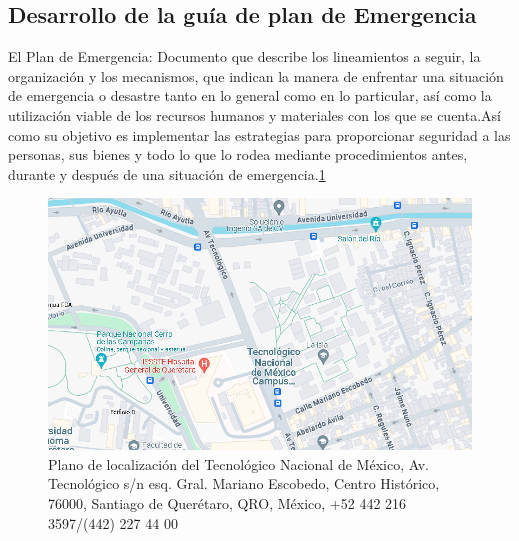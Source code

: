     \subsection{Desarrollo de la guía de plan de Emergencia}
    
El Plan de Emergencia: Documento que describe los lineamientos a seguir, la organización y los mecanismos, que indican la manera de enfrentar una situación de emergencia o desastre tanto en lo general como en lo particular, así como la utilización viable de los recursos humanos y materiales con los que se cuenta.Así como su objetivo es implementar las estrategias para proporcionar seguridad a las personas, sus bienes y todo lo que lo rodea mediante procedimientos antes, durante y después de una situación de emergencia.\ref{fig:Plano de localización ITQ}
\begin{figure}[H]
    \centering
    \includegraphics[scale=0.4]{16/Img/mapaitq.PNG}
    \caption{ Plano de localización del Tecnológico Nacional de México, Av. Tecnológico s/n esq. Gral. Mariano Escobedo, Centro Histórico, 76000, Santiago de Querétaro, QRO, México, +52 442 216 3597/(442) 227 44 00}
    \label{fig:Plano de localización ITQ}
\end{figure}
    
